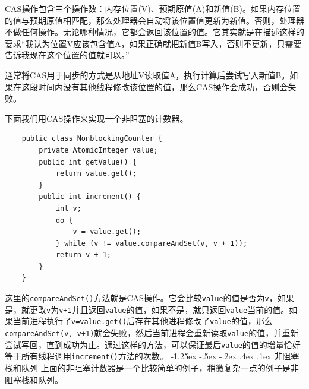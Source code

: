 \documentclass[a4paper, 11pt]{ctexart}
\makeatletter
\newcommand{\xiaosihao}{\fontsize{12pt}{\baselineskip}\selectfont}
\renewcommand\subsection{\@startsection{subsection}{1}{\z@}%
{-1.25ex \@plus -.5ex \@minus -.2ex}%
{.4ex \@plus .1ex}%
{\normalfont\xiaosihao\CJKfamily{hei}}}
\makeatother
\begin{document}
CAS操作包含三个操作数：内存位置(V)、预期原值(A)和新值(B)。如果内存位置的值与预期原值相匹配，那么处理器会自动将该位置值更新为新值。否则，处理器不做任何操作。无论哪种情况，它都会返回该位置的值。它其实就是在描述这样的要求“我认为位置V应该包含值A，如果正确就把新值B写入，否则不更新，只需要告诉我现在这个位置的值就可以。”

通常将CAS用于同步的方式是从地址V读取值A，执行计算后尝试写入新值B。如果在这段时间内没有其他线程修改该位置的值，那么CAS操作会成功，否则会失败。

下面我们用CAS操作来实现一个非阻塞的计数器。
\begin{lstlisting}
    public class NonblockingCounter {
        private AtomicInteger value;
        public int getValue() {
            return value.get();
        }
        public int increment() {
            int v;
            do {
                v = value.get();
            } while (v != value.compareAndSet(v, v + 1));
            return v + 1;
        }
    }
  \end{lstlisting}

这里的\lstinline|compareAndSet()|方法就是CAS操作。它会比较\lstinline|value|的值是否为\lstinline|v|，如果是，就更改\lstinline|v|为\lstinline|v+1|并且返回\lstinline|value|的值，如果不是，就只返回\lstinline|value|当前的值。如果当前进程执行了\lstinline|v=value.get()|后存在其他进程修改了\lstinline|value|的值，那么\lstinline|compareAndSet(v, v+1)|就会失败，然后当前进程会重新读取\lstinline|value|的值，并重新尝试写回，直到成功为止。通过这样的方法，可以保证最后\lstinline|value|的值的增量恰好等于所有线程调用\lstinline|increment()|方法的次数。
\subsection{非阻塞栈和队列}
上面的非阻塞计数器是一个比较简单的例子，稍微复杂一点的例子是非阻塞栈和队列。
\end{document}
